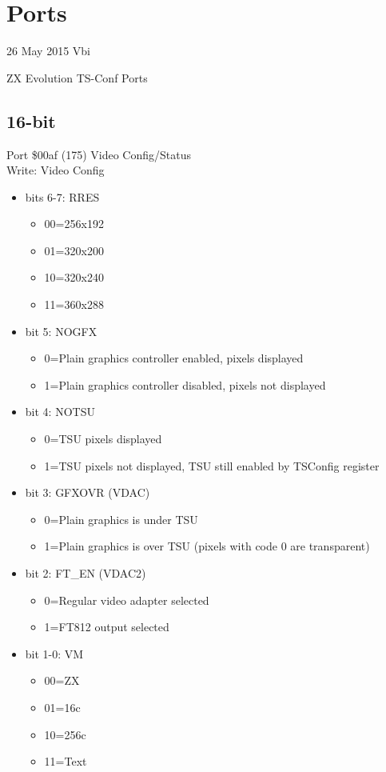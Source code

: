 \chapter{Ports}

26 May 2015  Vbi

\begin{table}[h]\centering\tiny
  \caption{ZX Evolution TS-Conf Ports}
\end{table}

\section{16-bit}
Port \$00af (175) Video Config/Status\\
Write: Video Config
\begin{itemize}
\item[] bits 6-7: RRES
  \begin{itemize}
  \item[] 00=256x192
  \item[] 01=320x200
  \item[] 10=320x240
  \item[] 11=360x288
  \end{itemize}
\item[] bit 5: NOGFX
  \begin{itemize}
  \item[] 0=Plain graphics controller enabled, pixels displayed
  \item[] 1=Plain graphics controller disabled, pixels not displayed
  \end{itemize}
\item[] bit 4: NOTSU
  \begin{itemize}
  \item[] 0=TSU pixels displayed
  \item[] 1=TSU pixels not displayed, TSU still enabled by TSConfig register
  \end{itemize}
\item[] bit 3: GFXOVR (VDAC)
  \begin{itemize}
  \item[] 0=Plain graphics is under TSU
  \item[] 1=Plain graphics is over TSU (pixels with code 0 are transparent)
  \end{itemize}
\item[] bit 2: FT\_EN (VDAC2)
  \begin{itemize}
  \item[] 0=Regular video adapter selected
  \item[] 1=FT812 output selected
  \end{itemize}
\item[] bit 1-0: VM
  \begin{itemize}
  \item[] 00=ZX
  \item[] 01=16c
  \item[] 10=256c
  \item[] 11=Text
  \end{itemize}
\end{itemize}
